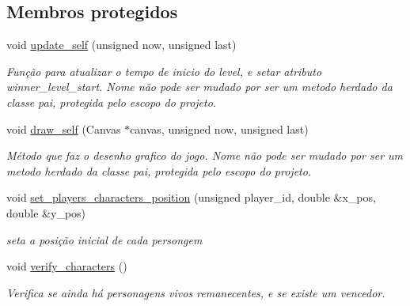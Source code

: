 \subsection*{Membros protegidos}
\begin{DoxyCompactItemize}
\item 
void \mbox{\hyperlink{classDeathMatchLevel_a104d4fac94d1ce45bb2548ea5467d53e}{update\+\_\+self}} (unsigned now, unsigned last)
\begin{DoxyCompactList}\small\item\em Função para atualizar o tempo de inicio do level, e setar atributo winner\+\_\+level\+\_\+start. Nome não pode ser mudado por ser um metodo herdado da classe pai, protegida pelo escopo do projeto. \end{DoxyCompactList}\item 
void \mbox{\hyperlink{classDeathMatchLevel_a38a915a954f5c8e8ba54c46057bc99d0}{draw\+\_\+self}} (Canvas $\ast$canvas, unsigned now, unsigned last)
\begin{DoxyCompactList}\small\item\em Método que faz o desenho grafico do jogo. Nome não pode ser mudado por ser um metodo herdado da classe pai, protegida pelo escopo do projeto. \end{DoxyCompactList}\item 
void \mbox{\hyperlink{classDeathMatchLevel_ab158f20b6f8d51254215553aa713b4cc}{set\+\_\+players\+\_\+characters\+\_\+position}} (unsigned player\+\_\+id, double \&x\+\_\+pos, double \&y\+\_\+pos)
\begin{DoxyCompactList}\small\item\em seta a posição inicial de cada persongem \end{DoxyCompactList}\item 
void \mbox{\hyperlink{classDeathMatchLevel_a5aa8c8eaaba63e222c692581c1f59c1a}{verify\+\_\+characters}} ()
\begin{DoxyCompactList}\small\item\em Verifica se ainda há personagens vivos remanecentes, e se existe um vencedor. \end{DoxyCompactList}\end{DoxyCompactItemize}
